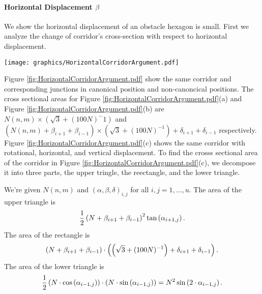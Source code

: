 \paragraph{Horizontal Displacement $\beta$}

We show the horizontal displacement of an obstacle hexagon is small.
First we analyze the change of corridor's cross-section with respect to horizontal displacement.

\begin{minipage}{\linewidth}
\begin{center}
\texttt{[image: graphics/HorizontalCorridorArgument.pdf]}
\label{fig:HorizontalCorridorArgument.pdf}
\end{center}
\end{minipage}
Figure \ref{fig:HorizontalCorridorArgument.pdf} show the same corridor and corresponding junctions in canonical position and non-canoncical positions.  
The cross sectional areas for Figure \ref{fig:HorizontalCorridorArgument.pdf}(a) and Figure \ref{fig:HorizontalCorridorArgument.pdf}(b) are $N(n,m) \times (\sqrt{3} + (100N)^-1)$ and $(N(n,m) + \beta_{i+1} + \beta_{i-1}) \times (\sqrt{3} + (100N)^{-1}) + \delta_{i+1} + \delta_{i-1}$ respectively.  
Figure \ref{fig:HorizontalCorridorArgument.pdf}(c) shows the same corridor with rotational, horizontal, and vertical displacement.
To find the crosss sectional area of the corridor in Figure \ref{fig:HorizontalCorridorArgument.pdf}(c), we decompose it into three parts, the upper tringle, the reectangle, and the lower triangle.  

We're given $N(n,m)$ and $(\alpha, \beta, \delta)_{i,j}$ for all $i,j = 1, \dots, u$. 
The area of the upper triangle is 
\begin{equation}\label{eqn:upperTriangle}
\frac{1}{2}\left( N+\beta_{i+1} + \beta_{i-1} \right)^2 \tan \left( \alpha_{i+1,j} \right).
\end{equation}
The area of the rectangle is 
\begin{equation}\label{eqn:rectangle}
\left( N + \beta_{i+1} + \beta_{i-1} \right) \cdot \left( \left( \sqrt{3} + (100N)^{-1} \right) + \delta_{i+1} + \delta_{i-1} \right).
\end{equation}
The area of the lower triangle is 
\begin{equation}\label{eqn:lowerTriangle}
\frac{1}{2} \left( N \cdot \cos \left(  \alpha_{i-1,j}  \right)  \right) \cdot \left( N \cdot \sin \left( \alpha_{i-1,j} \right)  \right)= N^2 \sin \left( 2 \cdot \alpha_{i-1,j} \right).
\end{equation}



